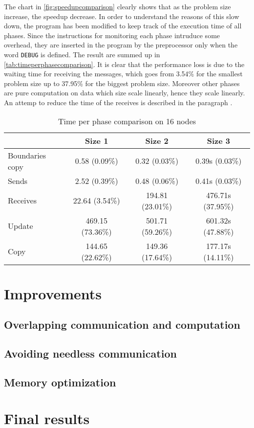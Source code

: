 \documentclass{article}
\begin{document}
The chart in \autoref{fig:speedupcomparison} clearly shows that as the problem size increase, the speedup decrease. In order to understand the reasons of this slow down, the program has been modified to keep track of the execution time of all phases. Since the instructions for monitoring each phase intruduce some overhead, they are inserted in the program by the preprocessor only when the word \texttt{DEBUG} is defined. The result are summed up in \autoref{tab:timeperphasecomparison}. It is clear that the performance loss is due to the waiting time for receiving the messages, which goes from 3.54\% for the smallest problem size up to 37.95\% for the biggest problem size. Moreover other phases are pure computation on data which size scale linearly, hence they scale linearly. An attemp to reduce the time of the receives is described in the paragraph .


\begin{table}
\centering
\begin{tabular}{|l|c|c|c|}
\hline
& Size 1 & Size 2 & Size 3\\
\hline
Boundaries copy & 0.58 (0.09\%) & 0.32 (0.03\%) & 0.39s (0.03\%) \\
\hline
Sends & 2.52 (0.39\%) & 0.48 (0.06\%) & 0.41s (0.03\%) \\
\hline
Receives & 22.64 (3.54\%) & 194.81 (23.01\%) & 476.71s (37.95\%) \\
\hline
Update & 469.15 (73.36\%) & 501.71 (59.26\%) & 601.32s (47.88\%) \\
\hline
Copy & 144.65 (22.62\%) & 149.36 (17.64\%) & 177.17s (14.11\%) \\
\hline
\end{tabular}
\caption{Time per phase comparison on 16 nodes} \label{tab:timeperphasecomparison}
\end{table}






 







\section{Improvements}

\subsection{Overlapping communication and computation} \label{sec:overlappingcommcomp}
\subsection{Avoiding needless communication}
\subsection{Memory optimization}
\subsection{}



\section{Final results}
\end{document}
